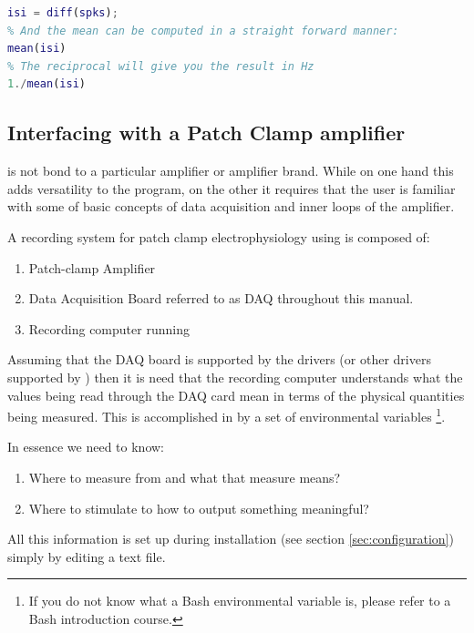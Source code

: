 \begin{lstlisting}[language=matlab,morekeywords={findpeaks,THRESHOLD,MINPEAKDISTANCE},escapeinside=\{\}]
% Compute te interspike intervals
isi = diff(spks);
% And the mean can be computed in a straight forward manner:
mean(isi)
% The reciprocal will give you the result in Hz
1./mean(isi)
\end{lstlisting}


\subsection{Interfacing with a Patch Clamp amplifier}

\progname is not bond to a particular amplifier or amplifier brand. While on one hand this adds versatility to the program, on the other it requires that the user is familiar with some of basic concepts of data acquisition and inner loops of the amplifier.

A recording system for patch clamp electrophysiology using \progname is composed of:
\begin{enumerate}
\item{Patch-clamp Amplifier}
\item{Data Acquisition Board} referred to as DAQ throughout this manual.
\item{Recording computer running \progname}
\end{enumerate}

Assuming that the DAQ board is supported by the \comedi drivers (or other drivers supported by \progname) then it is need that the recording computer understands what the values being read through the DAQ card mean in terms of the physical quantities being measured. This is accomplished in \progname by a set of environmental variables \footnote{If you do not know what a Bash environmental variable is, please refer to a Bash introduction course.}.

In essence we need to know:
\begin{enumerate}
\item{Where to measure from and what that measure means?}
\item{Where to stimulate to how to output something meaningful?}
\end{enumerate}
All this information is set up during installation (see section \ref{sec:configuration}) simply by editing a text file. 

